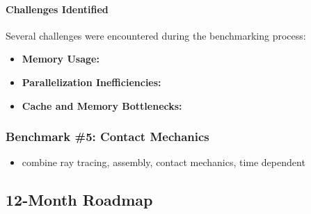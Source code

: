 \paragraph{Challenges Identified}
Several challenges were encountered during the benchmarking process:
\begin{itemize}
    \item \textbf{Memory Usage:}
    \item \textbf{Parallelization Inefficiencies:}
    \item \textbf{Cache and Memory Bottlenecks:}
\end{itemize}



\subsubsection{Benchmark \#5: Contact Mechanics}

\begin{itemize}
    \item combine ray tracing, assembly, contact mechanics, time dependent
\end{itemize}

\subsection{12-Month Roadmap}
\label{sec:WP1:Feelpp:roadmap}

